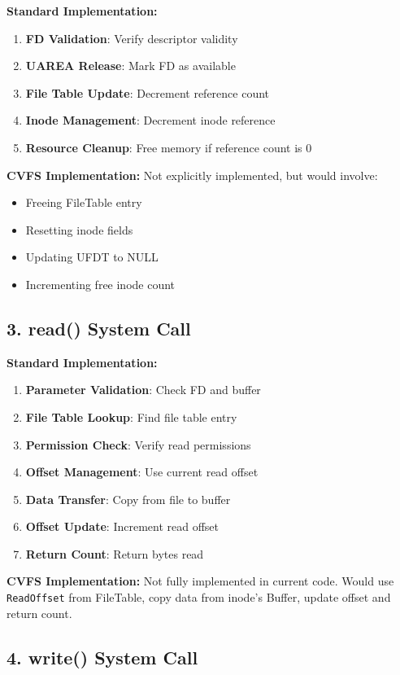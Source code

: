 \documentclass[11pt,a4paper]{article}
\begin{document}
\textbf{Standard Implementation:}
\begin{enumerate}
    \item \textbf{FD Validation}: Verify descriptor validity
    \item \textbf{UAREA Release}: Mark FD as available
    \item \textbf{File Table Update}: Decrement reference count
    \item \textbf{Inode Management}: Decrement inode reference
    \item \textbf{Resource Cleanup}: Free memory if reference count is 0
\end{enumerate}

\textbf{CVFS Implementation:}
Not explicitly implemented, but would involve:
\begin{itemize}
    \item Freeing FileTable entry
    \item Resetting inode fields
    \item Updating UFDT to NULL
    \item Incrementing free inode count
\end{itemize}

\subsection{3. read() System Call}

\textbf{Standard Implementation:}
\begin{enumerate}
    \item \textbf{Parameter Validation}: Check FD and buffer
    \item \textbf{File Table Lookup}: Find file table entry
    \item \textbf{Permission Check}: Verify read permissions
    \item \textbf{Offset Management}: Use current read offset
    \item \textbf{Data Transfer}: Copy from file to buffer
    \item \textbf{Offset Update}: Increment read offset
    \item \textbf{Return Count}: Return bytes read
\end{enumerate}

\textbf{CVFS Implementation:}
Not fully implemented in current code. Would use \texttt{ReadOffset} from FileTable, copy data from inode's Buffer, update offset and return count.

\subsection{4. write() System Call}
\end{document}
